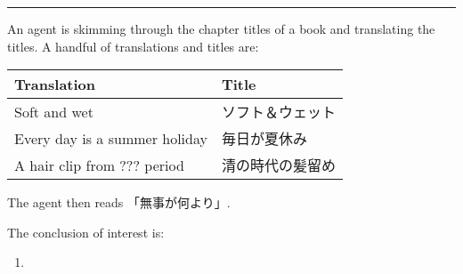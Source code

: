 \documentclass[10pt]{article}
\newcommand\lLine{{\color{lightgray} \noindent\rule{\textwidth}{0.4pt}}}
\begin{document}
\lLine

\begin{note}
    \begin{scenario}[ジョジョリオン]%
    \label{scen:jojo}%
    \nocite{huangmufeiluyan:2011aa}%
    An agent is skimming through the chapter titles of a book and translating the titles.
    A handful of translations and titles are:

    \begin{center}
      \bgroup
      \def\arraystretch{1.125}
      \begin{tabular}{R{.45\textwidth} L{.45\textwidth}}
        Translation & Title \\
        \hline
        Soft and wet & ソフト＆ウェット \\
        Every day is a summer holiday & 毎日が夏休み \\
        A hair clip from ??? period & 清の時代の髪留め \\
      \end{tabular}
      \egroup
    \end{center}

    \noindent%
    The agent then reads 「無事が何より」.
  \end{scenario}

  \noindent%
  The conclusion of interest is:
  \begin{enumerate}[label=C\thescenarioCounter., ref=C\thescenarioCounter]
  \item
    \label{scen:jojo:c}
  \end{enumerate}
\end{note}
\end{document}
